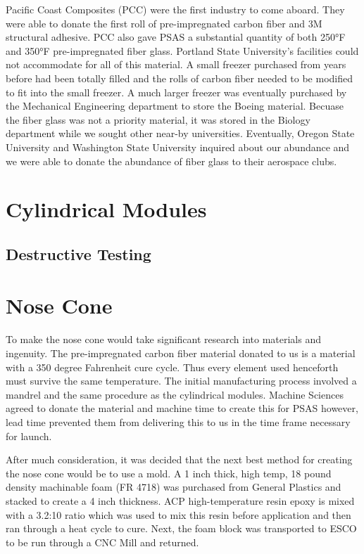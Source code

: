 \documentclass{aiaa-tc}%
\begin{document}
Pacific Coast Composites (PCC) were the first industry to come aboard. They were able to donate the first roll of pre-impregnated carbon fiber and 3M structural adhesive. PCC also gave PSAS a substantial quantity of both 250°F and 350°F pre-impregnated fiber glass. Portland State University's facilities could not accommodate for all of this material. A small freezer purchased from years before had been totally filled and the rolls of carbon fiber needed to be modified to fit into the small freezer. A much larger freezer was eventually purchased by the Mechanical Engineering department to store the Boeing material. Becuase the fiber glass was not a priority material, it was stored in the Biology department while we sought other near-by universities. Eventually, Oregon State University and Washington State University inquired about our abundance and we were able to donate the abundance of fiber glass to their aerospace clubs. 


\section{Cylindrical Modules}

\subsection{Destructive Testing}

\section{Nose Cone}\label{sec:noseCone}
To make the nose cone would take significant research into materials and ingenuity. The pre-impregnated carbon fiber material donated to us is a material with a 350 degree Fahrenheit cure cycle. Thus every element used henceforth must survive the same temperature. The initial manufacturing process involved a mandrel and the same procedure as the cylindrical modules. Machine Sciences agreed to donate the material and machine time to create this for PSAS however, lead time prevented them from delivering this to us in the time frame necessary for launch. 

After much consideration, it was decided that the next best method for creating the nose cone would be to use a mold. A 1 inch thick, high temp, 18 pound density machinable foam (FR 4718) was purchased from General Plastics and stacked to create a 4 inch thickness. ACP high-temperature resin epoxy is mixed with a 3.2:10 ratio which was used to mix this resin before application and then ran through a heat cycle to cure. Next, the foam block was transported to ESCO to be run through a CNC Mill and returned. 
\end{document}

